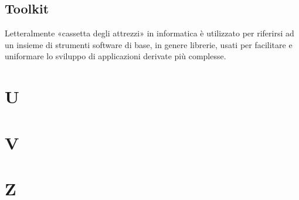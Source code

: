 \subsection*{Toolkit}
Letteralmente «cassetta degli attrezzi» in informatica è utilizzato per riferirsi ad un insieme di strumenti software di base, in genere librerie, usati per facilitare e uniformare lo sviluppo di applicazioni derivate più complesse. 

\section*{U}

\section*{V}

\section*{Z}

